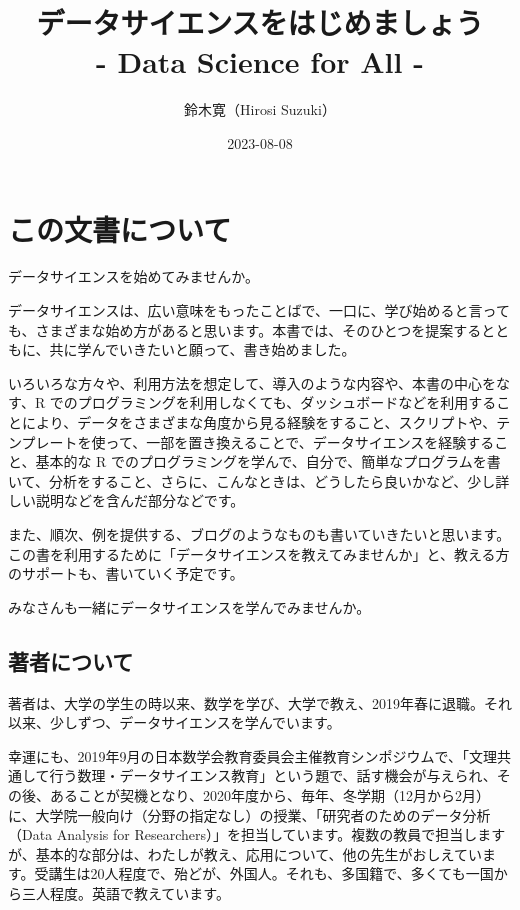 \documentclass[
  xelatex, ja=standard]{bxjsbook}
\title{データサイエンスをはじめましょう\\
- Data Science for All -}
\author{鈴木寛（Hirosi Suzuki）}
\date{2023-08-08}
\theoremstyle{definition}
\theoremstyle{definition}
\theoremstyle{definition}
\theoremstyle{definition}
\theoremstyle{remark}
\begin{document}
\maketitle

{
\setcounter{tocdepth}{1}
\tableofcontents
}
\hypertarget{ux3053ux306eux6587ux66f8ux306bux3064ux3044ux3066}{%
\chapter*{この文書について}\label{ux3053ux306eux6587ux66f8ux306bux3064ux3044ux3066}}

データサイエンスを始めてみませんか。

データサイエンスは、広い意味をもったことばで、一口に、学び始めると言っても、さまざまな始め方があると思います。本書では、そのひとつを提案するとともに、共に学んでいきたいと願って、書き始めました。

いろいろな方々や、利用方法を想定して、導入のような内容や、本書の中心をなす、R でのプログラミングを利用しなくても、ダッシュボードなどを利用することにより、データをさまざまな角度から見る経験をすること、スクリプトや、テンプレートを使って、一部を置き換えることで、データサイエンスを経験すること、基本的な R でのプログラミングを学んで、自分で、簡単なプログラムを書いて、分析をすること、さらに、こんなときは、どうしたら良いかなど、少し詳しい説明などを含んだ部分などです。

また、順次、例を提供する、ブログのようなものも書いていきたいと思います。この書を利用するために「データサイエンスを教えてみませんか」と、教える方のサポートも、書いていく予定です。

みなさんも一緒にデータサイエンスを学んでみませんか。

\hypertarget{ux8457ux8005ux306bux3064ux3044ux3066}{%
\section*{著者について}\label{ux8457ux8005ux306bux3064ux3044ux3066}}

著者は、大学の学生の時以来、数学を学び、大学で教え、2019年春に退職。それ以来、少しずつ、データサイエンスを学んでいます。

幸運にも、2019年9月の日本数学会教育委員会主催教育シンポジウムで、「文理共通して行う数理・データサイエンス教育」という題で、話す機会が与えられ、その後、あることが契機となり、2020年度から、毎年、冬学期（12月から2月）に、大学院一般向け（分野の指定なし）の授業、「研究者のためのデータ分析（Data Analysis for Researchers）」を担当しています。複数の教員で担当しますが、基本的な部分は、わたしが教え、応用について、他の先生がおしえています。受講生は20人程度で、殆どが、外国人。それも、多国籍で、多くても一国から三人程度。英語で教えています。
\end{document}
